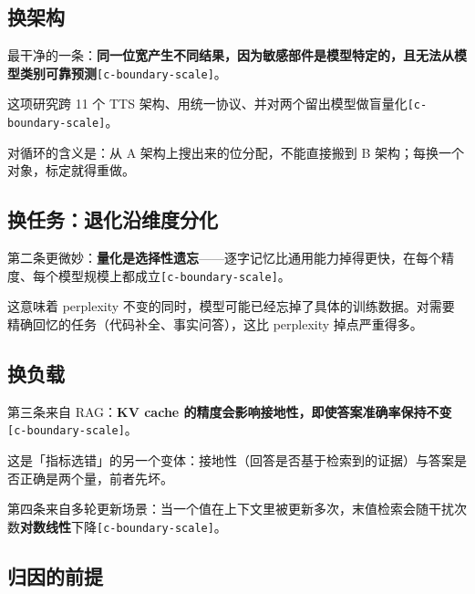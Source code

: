 \subsection{换架构}

最干净的一条：\textbf{同一位宽产生不同结果，因为敏感部件是模型特定的，且无法从模型类别可靠预测}{\scriptsize\texttt{[c-\hspace{0pt}boundary-\hspace{0pt}scale]}}。


这项研究跨 11 个 TTS 架构、用统一协议、并对两个留出模型做盲量化{\scriptsize\texttt{[c-\hspace{0pt}boundary-\hspace{0pt}scale]}}。


对循环的含义是：从 A 架构上搜出来的位分配，不能直接搬到 B 架构；每换一个对象，标定就得重做。


\subsection{换任务：退化沿维度分化}

第二条更微妙：\textbf{量化是选择性遗忘}——逐字记忆比通用能力掉得更快，在每个精度、每个模型规模上都成立{\scriptsize\texttt{[c-\hspace{0pt}boundary-\hspace{0pt}scale]}}。


这意味着 perplexity 不变的同时，模型可能已经忘掉了具体的训练数据。对需要精确回忆的任务（代码补全、事实问答），这比 perplexity 掉点严重得多。


\subsection{换负载}

第三条来自 RAG：\textbf{KV cache 的精度会影响接地性，即使答案准确率保持不变}{\scriptsize\texttt{[c-\hspace{0pt}boundary-\hspace{0pt}scale]}}。


这是「指标选错」的另一个变体：接地性（回答是否基于检索到的证据）与答案是否正确是两个量，前者先坏。


第四条来自多轮更新场景：当一个值在上下文里被更新多次，末值检索会随干扰次数\textbf{对数线性}下降{\scriptsize\texttt{[c-\hspace{0pt}boundary-\hspace{0pt}scale]}}。


\subsection{归因的前提}

